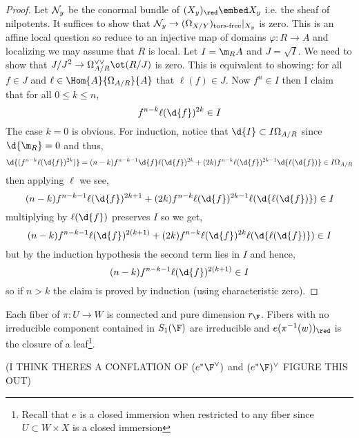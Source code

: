 \documentclass[12pt]{article}
\begin{document}
\begin{proof}
Let $\mathcal{N}_y$ be the conormal bundle of $(X_y)_\red \embed X_y$ i.e. the sheaf of nilpotents. It suffices to show that $\mathcal{N}_y \to (\Omega_{X/Y})_{\text{tors-free}} |_{X_y}$ is zero. This is an affine local question so reduce to an injective map of domains $\varphi : R \to A$ and localizing we may assume that $R$ is local. Let $I = \m_R A$ and $J = \sqrt{I}$. We need to show that $J/J^2 \to \Omega_{A/R}^{\vee \vee} \ot (R / J)$ is zero. This is equivalent to showing: for all $f \in J$ and $\ell \in \Hom{A}{\Omega_{A/R}}{A}$ that $\ell(f) \in J$. Now $f^n \in I$ then I claim that for all $0 \le k \le n$,
\[ f^{n-k} \ell(\d{f})^{2k} \in I \]
The case $k = 0$ is obvious. For induction, notice that $\d{I} \subset I \Omega_{A/R}$ since $\d{\m_R} = 0$ and thus,
\[ \d{(f^{n-k} \ell(\d{f})^{2k})} = (n-k) f^{n-k-1} \d{f} \ell(\d{f})^{2k} + (2k) f^{n-k} \ell(\d{f})^{2k-1} \d{\ell(\d{f})} \in I \Omega_{A/R} \]
then applying $\ell$ we see,
\[ (n-k) f^{n-k-1} \ell(\d{f})^{2k+1} + (2k) f^{n-k} \ell(\d{f})^{2k-1} \ell(\d{\ell(\d{f})}) \in I \]
multiplying by $\ell(\d{f})$ preserves $I$ so we get,
\[ (n-k) f^{n-k-1} \ell(\d{f})^{2(k+1)} + (2k) f^{n-k} \ell(\d{f})^{2k} \ell(\d{\ell(\d{f})}) \in I \]
but by the induction hypothesis the second term lies in $I$ and hence,
\[ (n-k) f^{n-k-1} \ell(\d{f})^{2(k+1)} \in I \]
so if $n > k$ the claim is proved by induction (using characteristic zero).
\end{proof}

\begin{lemma}
Each fiber of $\pi : U \to W$ is connected and pure dimension $r_\F$. Fibers with no irreducible component contained in $S_1(\F)$ are irreducible and $e(\pi^{-1}(w))_{\red}$ is the closure of a leaf\footnote{Recall that $e$ is a closed immersion when restricted to any fiber since $U \subset W \times X$ is a closed immersion}.
\end{lemma}

(I THINK THERES A CONFLATION OF $(e^* \F^\vee)$ and $(e^* \F)^\vee$ FIGURE THIS OUT)
\end{document}
